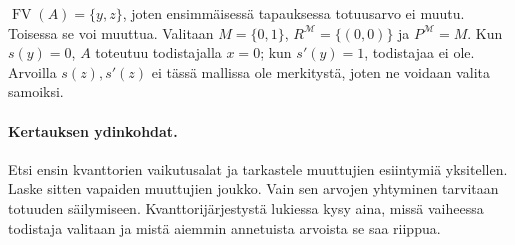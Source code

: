 \documentclass[11pt,a4paper]{amsart}
\begin{document}
\begin{solution}
  $\operatorname{FV}(A)=\{y,z\}$, joten ensimmäisessä tapauksessa
  totuusarvo ei muutu. Toisessa se voi muuttua. Valitaan
  $M=\{0,1\}$, $R^{\mathcal M}=\{(0,0)\}$ ja
  $P^{\mathcal M}=M$. Kun $s(y)=0$, $A$ toteutuu todistajalla $x=0$;
  kun $s'(y)=1$, todistajaa ei ole. Arvoilla $s(z),s'(z)$ ei tässä
  mallissa ole merkitystä, joten ne voidaan valita samoiksi.
\end{solution}

\paragraph{Kertauksen ydinkohdat.}
Etsi ensin kvanttorien vaikutusalat ja tarkastele muuttujien
esiintymiä yksitellen. Laske sitten vapaiden muuttujien joukko.
Vain sen arvojen yhtyminen tarvitaan totuuden säilymiseen.
Kvanttorijärjestystä lukiessa kysy aina, missä vaiheessa todistaja
valitaan ja mistä aiemmin annetuista arvoista se saa riippua.
\end{document}
